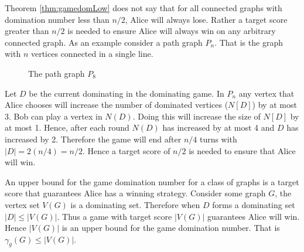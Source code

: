 Theorem \ref{thm:gamedomLow} does not say that for all connected graphs with domination number less than $n/2$, Alice will always lose. Rather a target score greater than $n/2$ is needed to ensure Alice will always win on any arbitrary connected graph. As an example consider a path graph $P_n$. That is the graph with $n$ vertices connected in a single line. 

\begin{figure}[H]
    \centering
    \caption{The path graph $P_8$}
\end{figure}
Let $D$ be the current dominating in the dominating game. In $P_n$ any vertex that Alice chooses will increase the number of dominated vertices ($N[D]$) by at most 3. Bob can play a vertex in $N(D)$. Doing this will increase the size of $N[D]$ by at most 1. Hence, after each round $N(D)$ has increased by at most 4 and $D$ has increased by 2. Therefore the game will end after $n/4$ turns with $|D| = 2(n/4) = n/2$. Hence a target score of $n/2$ is needed to ensure that Alice will win.


An upper bound for the game domination number for a class of graphs is a target score that guarantees Alice has a winning strategy. Consider some graph $G$, the vertex set $V(G)$ is a dominating set. Therefore when $D$ forms a dominating set $|D|\leq |V(G)|$. Thus a game with target score $|V(G)|$ guarantees Alice will win. Hence $|V(G)|$ is an upper bound for the game domination number. That is $\gamma_g(G) \leq |V(G)|$. 

